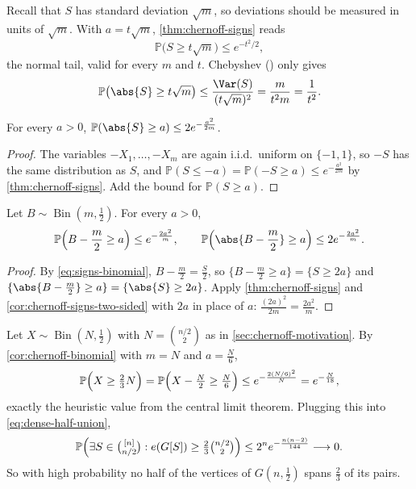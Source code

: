 \begin{remark}\label{rmk:chernoff-vs-normal}
    Recall that \(S\) has standard deviation \(\sqrt{m}\), so deviations should be measured in units of \(\sqrt{m}\). With \(a = t\sqrt{m}\), \autoref{thm:chernoff-signs} reads
    \[
        \mathbb{P}\bigl( S \ge t\sqrt{m} \bigr) \le e^{-t^{2}/2} ,
    \]
    the normal tail, valid for every \(m\) and \(t\). Chebyshev () only gives
    \[
        \mathbb{P}\bigl( \abs{S} \ge t\sqrt{m} \bigr) \le \frac{\Var(S)}{(t\sqrt{m})^{2}} = \frac{m}{t^{2} m} = \frac{1}{t^{2}} .
    \]
\end{remark}

\begin{corollary}\label{cor:chernoff-signs-two-sided}
    For every \(a > 0\), \(\mathbb{P}(\abs{S} \ge a) \le 2 e^{-\frac{a^{2}}{2m}}\).
\end{corollary}

\begin{proof}
    The variables \(-X_{1}, \ldots, -X_{m}\) are again i.i.d.\ uniform on \(\{-1, 1\}\), so \(-S\) has the same distribution as \(S\), and \(\mathbb{P}(S \le -a) = \mathbb{P}(-S \ge a) \le e^{-\frac{a^{2}}{2m}}\) by \autoref{thm:chernoff-signs}. Add the bound for \(\mathbb{P}(S \ge a)\).
\end{proof}

\begin{corollary}\label{cor:chernoff-binomial}
    Let \(B \sim \operatorname{Bin}(m, \frac{1}{2})\). For every \(a > 0\),
    \[
        \mathbb{P}\Bigl( B - \frac{m}{2} \ge a \Bigr) \le e^{-\frac{2a^{2}}{m}},
        \qquad
        \mathbb{P}\Bigl( \abs{B - \frac{m}{2}} \ge a \Bigr) \le 2 e^{-\frac{2a^{2}}{m}} .
    \]
\end{corollary}

\begin{proof}
    By \eqref{eq:signs-binomial}, \(B - \frac{m}{2} = \frac{S}{2}\), so \(\{ B - \frac{m}{2} \ge a \} = \{ S \ge 2a \}\) and \(\{ \abs{B - \frac{m}{2}} \ge a \} = \{ \abs{S} \ge 2a \}\). Apply \autoref{thm:chernoff-signs} and \autoref{cor:chernoff-signs-two-sided} with \(2a\) in place of \(a\): \(\frac{(2a)^{2}}{2m} = \frac{2a^{2}}{m}\).
\end{proof}

\begin{eg}\label{eg:dense-half}
    Let \(X \sim \operatorname{Bin}(N, \frac{1}{2})\) with \(N = \binom{n/2}{2}\) as in \autoref{sec:chernoff-motivation}. By \autoref{cor:chernoff-binomial} with \(m = N\) and \(a = \frac{N}{6}\),
    \[
        \mathbb{P}\Bigl( X \ge \tfrac{2}{3} N \Bigr) = \mathbb{P}\Bigl( X - \tfrac{N}{2} \ge \tfrac{N}{6} \Bigr) \le e^{-\frac{2 (N/6)^{2}}{N}} = e^{-\frac{N}{18}} ,
    \]
    exactly the heuristic value from the central limit theorem. Plugging this into \eqref{eq:dense-half-union},
    \[
        \mathbb{P}\Bigl( \exists S \in \tbinom{[n]}{n/2} : e(G[S]) \ge \tfrac{2}{3} \tbinom{n/2}{2} \Bigr)
        \le 2^{n} e^{-\frac{n(n-2)}{144}} \longrightarrow 0 .
    \]
    So with high probability no half of the vertices of \(G(n, \frac{1}{2})\) spans \(\frac{2}{3}\) of its pairs.
\end{eg}

